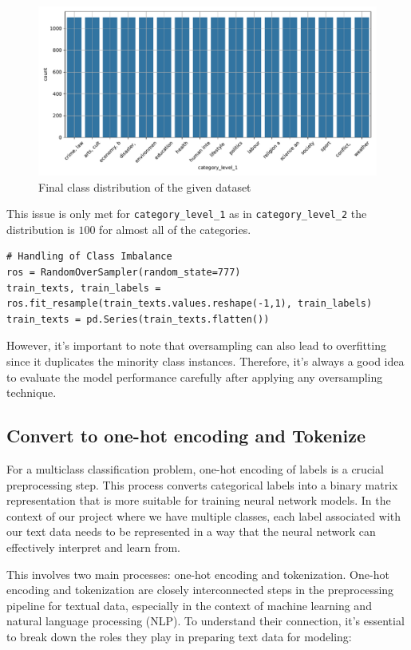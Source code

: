 \begin{figure}[htpb]
	\centering
	\includegraphics[width=\linewidth]{Images/final_class_distribution.pdf}
	\caption{Final class distribution of the given dataset}
	\label{fig:final_class_distribution}
\end{figure}

This issue is only met for \verb|category_level_1| as in \verb|category_level_2| the distribution is $100$ for almost all of the categories.\\

\begin{lstlisting}
# Handling of Class Imbalance
ros = RandomOverSampler(random_state=777)
train_texts, train_labels = ros.fit_resample(train_texts.values.reshape(-1,1), train_labels)
train_texts = pd.Series(train_texts.flatten())
\end{lstlisting}

However, it's important to note that oversampling can also lead to overfitting since it duplicates the minority class instances. Therefore, it's always a good idea to evaluate the model performance carefully after applying any oversampling technique.

\subsection{Convert to one-hot encoding and Tokenize}
For a multiclass classification problem, one-hot encoding of labels is a crucial preprocessing step. This process converts categorical labels into a binary matrix representation that is more suitable for training neural network models.
In the context of our project where we have multiple classes, each label associated with our text data needs to be represented in a way that the neural network can effectively interpret and learn from.

This involves two main processes: one-hot encoding and tokenization. One-hot encoding and tokenization are closely interconnected steps in the preprocessing pipeline for textual data, especially in the context of machine learning and natural language processing (NLP). To understand their connection, it's essential to break down the roles they play in preparing text data for modeling: \\


